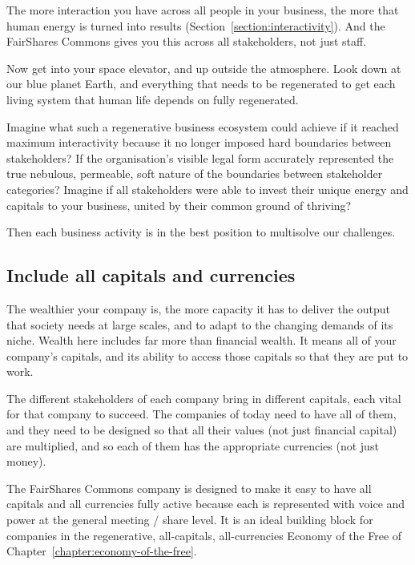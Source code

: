 The more interaction you have across all people in your business, the more that human energy is turned into results (Section~\ref{section:interactivity}). And the FairShares Commons gives you this across all stakeholders, not just staff.


Now get into your space elevator, and up outside the atmosphere. Look down at our blue planet Earth, and everything that needs to be regenerated to get each living system that human life depends on fully regenerated. 


Imagine what such a regenerative business ecosystem could achieve if it reached maximum interactivity because it no longer imposed hard boundaries between stakeholders? If the organisation’s  visible legal form accurately represented the true nebulous, permeable, soft nature of the boundaries between stakeholder categories? Imagine if all stakeholders were able to invest their unique energy and capitals to your business, united by their common ground of thriving? 


Then each business activity is in the best position to multisolve our challenges.




\subsection{Include all capitals and currencies}
The wealthier your company is, the more capacity it has to deliver the output that society needs at large scales, and to adapt to the changing demands of its niche. Wealth here includes far more than financial wealth. It means all of your company’s capitals, and its ability to access those capitals so that they are put to work.


The different stakeholders of each company bring in different capitals, each vital for that company to succeed. The companies of today need to have all of them, and they need to be designed so that all their values (not just financial capital) are multiplied, and so each of them has the appropriate currencies (not just money). 


The FairShares Commons company is designed to make it easy to have all capitals and all currencies fully active because each is represented with voice and power at the general meeting / share level. It is an ideal building block for companies in the regenerative, all-capitals, all-currencies Economy of the Free  of Chapter~\ref{chapter:economy-of-the-free}.



